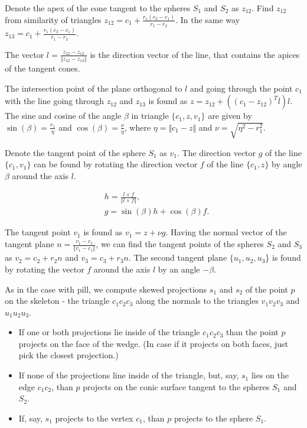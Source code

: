 Denote the apex of the cone tangent to the spheres $S_1$ and $S_2$ as $z_{12}$. Find $z_{12}$ from similarity of triangles $z_{12} = c_1 +\frac{r_1 (c_2 - c_1)}{r_1 - r_2}$. In the same way $z_{13} = c_1 +\frac{r_1 (c_3 - c_1)}{r_1 - r_3}$.

The vector $l = \frac{z_{12} - z_{13}} {\Vert z_{12} - z_{13} \Vert}$ is the direction vector of the line, that contains the apices of the tangent cones.

The intersection point of the plane orthogonal to $l$ and going through the point $c_1$ with the line going through $z_{12}$ and $z_{13}$ is found as
$z = z_{12} + ((c_1 - z_{12})^T l )l$.
The sine and cosine of the angle $\beta$ in triangle $\{c_1, z, v_1\}$ are given by 
$\sin(\beta) = \frac{r_1}{\eta}$ 
and 
$\cos(\beta) = \frac{\nu}{\eta}$,
where $\eta = \Vert c_1 - z \Vert $ and $\nu = \sqrt{\eta^2 -  r_1^2}$. 

Denote the tangent point of the sphere $S_1$ as $v_1$. The direction vector $g$ of the line $\{c_1, v_1\}$ can be found by rotating the direction vector $f$ of the line 
$\{c_1, z\}$ by angle $\beta$ around the axis $l$.

\begin{align*}
	& h = \frac{l \times f}{\Vert l \times f \Vert}, \\
	& g = \sin(\beta) h + \cos(\beta) f.	
\end{align*}

The tangent point $v_1$ is found as $v_1 = z + \nu  g$. Having the normal vector of the tangent plane $n = \frac{v_1 - c_1}{\Vert v_1 - c_1 \Vert}$, we can find the tangent points of the spheres $S_2$ and $S_3$ as $v_2 = c_2  + r_2 n$ and $v_3 = c_3 + r_3 n$.
The second tangent plane $\{u_1, u_2, u_3$\} is found by rotating the vector $f$ around the axis $l$ by an angle $-\beta$.

As in the case with pill, we compute skewed projections $s_1$ and $s_2$ of the point $p$ on the skeleton  - the triangle $c_1 c_2 c_3$ along the normals to the triangles $v_1 v_2 v_3$ and $u_1 u_2 u_3$.

\begin{itemize}
\item If one or both projections lie inside of the triangle $c_1 c_2 c_3$ than the point $p$ projects on the face of the wedge. (In case if it projects on both faces, just pick the closest projection.) 
\item If none of the projections line inside of the triangle, but, say, $s_1$ lies on the edge $c_1 c_2$, than $p$ projects on the conic surface tangent to the spheres $S_1$ and $S_2$. 
\item If, say, $s_1$ projects to the vertex $c_1$, than $p$ projects to the sphere $S_1$.
\end{itemize}

